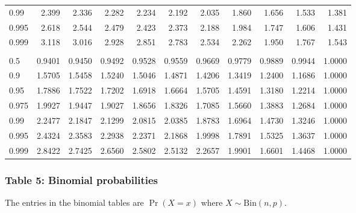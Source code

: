 \documentclass[
]{article}
\begin{document}
\begin{table}[H]
\begin{tabular}{lrrrrrrrrrr}
\hspace{1em}0.99 & 2.399 & 2.336 & 2.282 & 2.234 & 2.192 & 2.035 & 1.860 & 1.656 & 1.533 & 1.381\\
\hspace{1em}0.995 & 2.618 & 2.544 & 2.479 & 2.423 & 2.373 & 2.188 & 1.984 & 1.747 & 1.606 & 1.431\\
\hspace{1em}0.999 & 3.118 & 3.016 & 2.928 & 2.851 & 2.783 & 2.534 & 2.262 & 1.950 & 1.767 & 1.543\\
\addlinespace[0.3em]
\multicolumn{11}{l}{$k_2=\infty$}\\
\hspace{1em}0.5 & 0.9401 & 0.9450 & 0.9492 & 0.9528 & 0.9559 & 0.9669 & 0.9779 & 0.9889 & 0.9944 & 1.0000\\
\hspace{1em}0.9 & 1.5705 & 1.5458 & 1.5240 & 1.5046 & 1.4871 & 1.4206 & 1.3419 & 1.2400 & 1.1686 & 1.0000\\
\hspace{1em}0.95 & 1.7886 & 1.7522 & 1.7202 & 1.6918 & 1.6664 & 1.5705 & 1.4591 & 1.3180 & 1.2214 & 1.0000\\
\hspace{1em}0.975 & 1.9927 & 1.9447 & 1.9027 & 1.8656 & 1.8326 & 1.7085 & 1.5660 & 1.3883 & 1.2684 & 1.0000\\
\hspace{1em}0.99 & 2.2477 & 2.1847 & 2.1299 & 2.0815 & 2.0385 & 1.8783 & 1.6964 & 1.4730 & 1.3246 & 1.0000\\
\hspace{1em}0.995 & 2.4324 & 2.3583 & 2.2938 & 2.2371 & 2.1868 & 1.9998 & 1.7891 & 1.5325 & 1.3637 & 1.0000\\
\hspace{1em}0.999 & 2.8422 & 2.7425 & 2.6560 & 2.5802 & 2.5132 & 2.2657 & 1.9901 & 1.6601 & 1.4468 & 1.0000\\
\bottomrule
\end{tabular}
\end{table}

\newpage

\hypertarget{table-5-binomial-probabilities}{%
\subsubsection{Table 5: Binomial
probabilities}\label{table-5-binomial-probabilities}}

The entries in the binomial tables are \(\Pr(X=x)\) where
\(X\sim\text{Bin}(n,p)\).
\end{document}
